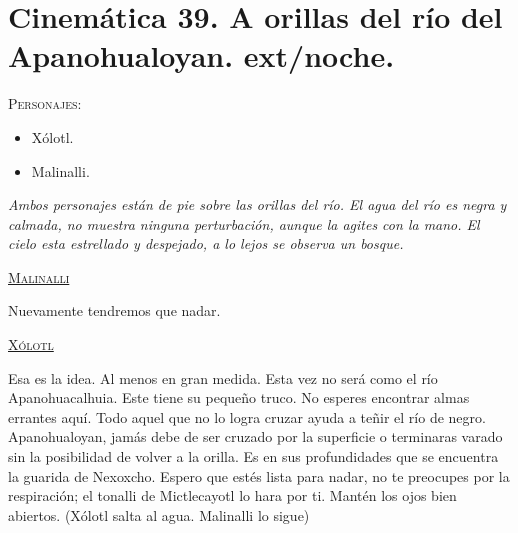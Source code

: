 \section{Cinemática 39. A orillas del río del Apanohualoyan. ext/noche.} \label{Cin:Cinematica39}
 \textsc{Personajes}:
 \begin{itemize}
 \item Xólotl.
 \item Malinalli.
 \end{itemize}
\textit{Ambos personajes están de pie sobre las orillas del río. El agua del río es negra y calmada, no muestra ninguna perturbación, aunque la agites con la mano. El cielo esta estrellado y despejado, a lo lejos se observa un bosque.}
\begin{center}
\textsc{\underline{Malinalli}}
\\
\par
Nuevamente tendremos que nadar.
\\
\par
\textsc{\underline{Xólotl}}
\\
\par
Esa es la idea. Al menos en gran medida. Esta vez no será como el río Apanohuacalhuia. Este tiene su pequeño truco. No esperes encontrar almas errantes aquí. Todo aquel que no lo logra cruzar ayuda a teñir el río de negro. Apanohualoyan, jamás debe de ser cruzado por la superficie o terminaras varado sin la posibilidad de volver a la orilla. Es en sus profundidades que se encuentra la guarida de Nexoxcho. Espero que estés lista para nadar, no te preocupes por la respiración; el tonalli de Mictlecayotl lo hara por ti. Mantén los ojos bien abiertos.
(Xólotl salta al agua. Malinalli lo sigue)
\end{center}